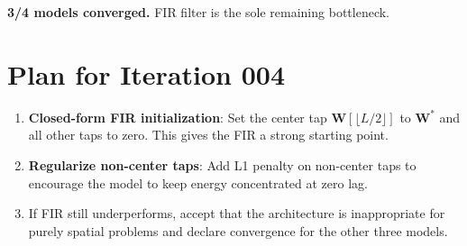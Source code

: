 \documentclass[11pt,a4paper]{article}
\begin{document}
\textbf{3/4 models converged.} FIR filter is the sole remaining bottleneck.

\section{Plan for Iteration 004}

\begin{enumerate}
  \item \textbf{Closed-form FIR initialization}: Set the center tap
    $\mathbf{W}[\lfloor L/2 \rfloor]$ to $\mathbf{W}^*$ and all other taps to
    zero. This gives the FIR a strong starting point.
  \item \textbf{Regularize non-center taps}: Add L1 penalty on non-center taps
    to encourage the model to keep energy concentrated at zero lag.
  \item If FIR still underperforms, accept that the architecture is inappropriate
    for purely spatial problems and declare convergence for the other three models.
\end{enumerate}
\end{document}
